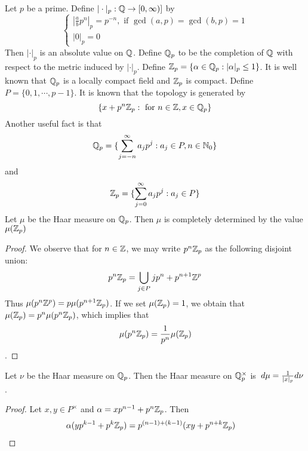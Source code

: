 \documentclass{book}
\begin{document}
	\begin{ex}  
		Let $p$ be a prime. Define $|\cdot |_p: \mathbb{Q} \rightarrow [0, \infty)]$ by 
		\[
		\begin{cases}
			|\frac{a}{b}p^n|_p = p^{-n}, \text{ if } \gcd(a,p) = \gcd(b,p) = 1 \\
			|0|_p = 0
		\end{cases}
		\]
		Then $|\cdot|_p$ is an absolute value on $\mathbb{Q}$. Define $\mathbb{Q}_p$ to be the completion of $\mathbb{Q}$ with respect to the metric induced by $|\cdot|_p$. Define $\mathbb{Z}_p = \{\alpha \in \mathbb{Q}_p: |\alpha|_p \leq 1 \}$. It is well known that $\mathbb{Q}_p$ is a locally compact field and $\mathbb{Z}_p$ is compact. Define $P = \{0, 1, \cdots, p-1\}$. It is known that the topology is generated by  $$\{x + p^n\mathbb{Z}_p: \text{ for } n \in \mathbb{Z}, x \in \mathbb{Q}_p\}$$ Another useful fact is that $$\mathbb{Q}_p = \{\sum_{j = -n}^{\infty} a_jp^j : a_j \in P, n \in \mathbb{N}_0\}$$ and $$\mathbb{Z}_p = \{\sum_{j = 0}^{\infty} a_jp^j : a_j \in P\}$$ 
		Let $\mu$ be the Haar measure on $\mathbb{Q}_p$. Then $\mu$ is completely determined by the value $\mu(\mathbb{Z}_p)$  
	\end{ex}

	\begin{proof}
		We observe that for $n \in \mathbb{Z}$, we may write $p^n \mathbb{Z}_p$ as the following disjoint union: $$p^n\mathbb{Z}_p = \bigcup\limits_{j \in P} jp^n + p^{n+1}\mathbb{Z}^p$$ Thus $\mu(p^n \mathbb{Z}^{p}) = p \mu(p^{n+1}\mathbb{Z}_p)$. If we set $\mu(\mathbb{Z}_p) = 1$, we obtain that $\mu(\mathbb{Z}_p) = p^n \mu(p^n\mathbb{Z}_p)$, which implies that $$\mu(p^n \mathbb{Z}_p) = \frac{1}{p^n}\mu(\mathbb{Z}_p)$$.  
	\end{proof}
	
	\begin{ex}  
		Let $\nu$ be the Haar measure on $\mathbb{Q}_p$. Then the Haar measure on $\mathbb{Q}_p^{\times}$  is $\, d \mu = \frac{1}{|x|_p}d \nu$.
	\end{ex}

	\begin{proof}
		Let $x, y \in P^{\times}$ and $\alpha = xp^{n-1} + p^n\mathbb{Z}_p$. Then 
		\begin{align*}
			\alpha (yp^{k-1} + p^k \mathbb{Z}_p) 
			& = p^{(n-1)+ (k-1)}(xy + p^{n+k} \mathbb{Z}_p) 
		\end{align*}
	\end{proof}
	
	
	
	
	
	
	
	
	
	
	
	
	
	
	
\end{document}
